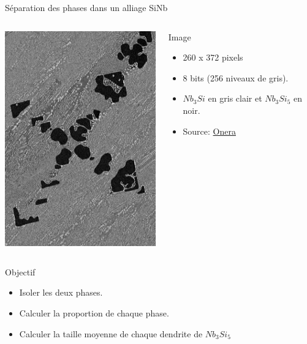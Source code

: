 \documentclass[8pt,a4paper]{beamer}
\begin{document}
\begin{frame}{Séparation des phases dans un alliage SiNb}
  \begin{columns}
\includegraphics[width=1.\textwidth]{figures/SiNb.png}

\begin{block}{Image}
  \begin{itemize}
  \item 260 x 372 pixels
  \item 8 bits (256 niveaux de gris).
  \item $Nb_3Si$ en gris clair et $Nb_3Si_5$ en noir.
  \item Source: \href{http://www.onera.fr/images-science/materiaux-structures/siliciure-niobium-galerie.php}{Onera}
  \end{itemize}
  \end{block}
\end{columns}
 
 
 
  \begin{block}{Objectif}
  \begin{itemize}
  \item Isoler les deux phases.
  \item Calculer la proportion de chaque phase.
  \item Calculer la taille moyenne de chaque dendrite de $Nb_3Si_5$
  \end{itemize}
  \end{block}
  \end{frame}
\end{document}
